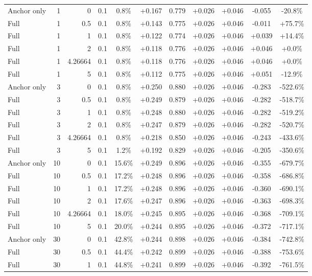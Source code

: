 \begin{table}[htbp]
\begin{tabular}{lrrrccccccc}
Anchor only & 1 & 0 & 0.1 & 0.8\% & +0.167 & 0.779 & +0.026 & +0.046 & -0.055 & -20.8\% \\
Full & 1 & 0.5 & 0.1 & 0.8\% & +0.143 & 0.775 & +0.026 & +0.046 & -0.011 & +75.7\% \\
Full & 1 & 1 & 0.1 & 0.8\% & +0.122 & 0.774 & +0.026 & +0.046 & +0.039 & +14.4\% \\
Full & 1 & 2 & 0.1 & 0.8\% & +0.118 & 0.776 & +0.026 & +0.046 & +0.046 & +0.0\% \\
Full & 1 & 4.26664 & 0.1 & 0.8\% & +0.118 & 0.776 & +0.026 & +0.046 & +0.046 & +0.0\% \\
Full & 1 & 5 & 0.1 & 0.8\% & +0.112 & 0.775 & +0.026 & +0.046 & +0.051 & -12.9\% \\
Anchor only & 3 & 0 & 0.1 & 0.8\% & +0.250 & 0.880 & +0.026 & +0.046 & -0.283 & -522.6\% \\
Full & 3 & 0.5 & 0.1 & 0.8\% & +0.249 & 0.879 & +0.026 & +0.046 & -0.282 & -518.7\% \\
Full & 3 & 1 & 0.1 & 0.8\% & +0.248 & 0.880 & +0.026 & +0.046 & -0.282 & -519.2\% \\
Full & 3 & 2 & 0.1 & 0.8\% & +0.247 & 0.879 & +0.026 & +0.046 & -0.282 & -520.7\% \\
Full & 3 & 4.26664 & 0.1 & 0.8\% & +0.218 & 0.850 & +0.026 & +0.046 & -0.243 & -433.6\% \\
Full & 3 & 5 & 0.1 & 1.2\% & +0.192 & 0.829 & +0.026 & +0.046 & -0.205 & -350.6\% \\
Anchor only & 10 & 0 & 0.1 & 15.6\% & +0.249 & 0.896 & +0.026 & +0.046 & -0.355 & -679.7\% \\
Full & 10 & 0.5 & 0.1 & 17.2\% & +0.248 & 0.896 & +0.026 & +0.046 & -0.358 & -686.8\% \\
Full & 10 & 1 & 0.1 & 17.2\% & +0.248 & 0.896 & +0.026 & +0.046 & -0.360 & -690.1\% \\
Full & 10 & 2 & 0.1 & 17.6\% & +0.247 & 0.896 & +0.026 & +0.046 & -0.363 & -698.3\% \\
Full & 10 & 4.26664 & 0.1 & 18.0\% & +0.245 & 0.895 & +0.026 & +0.046 & -0.368 & -709.1\% \\
Full & 10 & 5 & 0.1 & 20.0\% & +0.244 & 0.895 & +0.026 & +0.046 & -0.372 & -717.1\% \\
Anchor only & 30 & 0 & 0.1 & 42.8\% & +0.244 & 0.898 & +0.026 & +0.046 & -0.384 & -742.8\% \\
Full & 30 & 0.5 & 0.1 & 44.4\% & +0.242 & 0.899 & +0.026 & +0.046 & -0.388 & -753.6\% \\
Full & 30 & 1 & 0.1 & 44.8\% & +0.241 & 0.899 & +0.026 & +0.046 & -0.392 & -761.5\% \\

\end{tabular}
\end{table}
